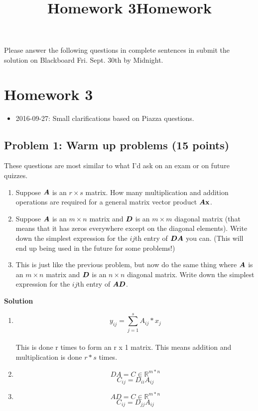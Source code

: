 \documentclass[]{article}
\title{Homework 3}
\title{Homework}
\providecommand{\tightlist}{%
  \setlength{\itemsep}{0pt}\setlength{\parskip}{0pt}}
\begin{document}
\maketitle

Please answer the following questions in complete sentences in submit
the solution on Blackboard Fri. Sept. 30th by Midnight.

\section{Homework 3}\label{homework-3}

\begin{itemize}
\tightlist
\item
  2016-09-27: Small clarifications based on Piazza questions.
\end{itemize}

\subsection{Problem 1: Warm up problems (15
points)}\label{problem-1-warm-up-problems-15-points}

These questions are most similar to what I'd ask on an exam or on future
quizzes.

\begin{enumerate}
\def\labelenumi{\arabic{enumi}.}
\item
  Suppose \(\boldsymbol{A}\) is an \(r \times s\) matrix. How many multiplication
  and addition operations are required for a general matrix vector
  product \(\boldsymbol{A} \boldsymbol{\mathrm{x}}\).
\item
  Suppose \(\boldsymbol{A}\) is an \(m \times n\) matrix and \(\boldsymbol{D}\) is an
  \(m \times m\) diagonal matrix (that means that it has zeros
  everywhere except on the diagonal elements). Write down the simplest
  expression for the \(ij\)th entry of \(\boldsymbol{D} \boldsymbol{A}\) you can. (This will
  end up being used in the future for some problems!)
\item
  This is just like the previous problem, but now do the same thing
  where \(\boldsymbol{A}\) is an \(m \times n\) matrix and \(\boldsymbol{D}\) is an
  \(n \times n\) diagonal matrix. Write down the simplest expression for
  the \(ij\)th entry of \(\boldsymbol{A} \boldsymbol{D}\).
\end{enumerate}

\textbf{Solution} 
\begin{enumerate}
\def\labelenumi{\arabic{enumi}.}
\item
\[ y_{ij} = \sum_{j=1}^{s} A_{ij}*x_{j} \] \\
This is done r times to form an r x 1 matrix. This means addition and multiplication is done $r*s$ times.
\item
\[ DA = C \in \mathbb{R}^{m*n}\]
\[ C_{ij} = D_{ii}A_{ij} \]
\item
\[ AD = C \in \mathbb{R}^{m*n}\]
\[ C_{ij} = D_{jj}A_{ij} \]
\end{enumerate}
\end{document}
